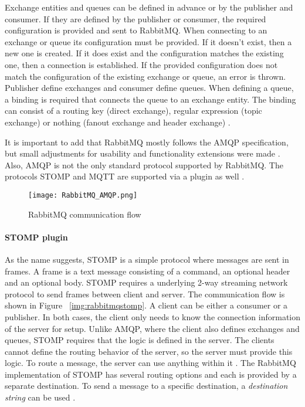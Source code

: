 Exchange entities and queues can be defined in advance or by the publisher and consumer.
If they are defined by the publisher or consumer, the required configuration is provided and sent to RabbitMQ.
When connecting to an exchange or queue its configuration must be provided.
If it doesn't exist, then a new one is created.
If it does exist and the configuration matches the existing one, then a connection is established.
If the provided configuration does not match the configuration of the existing exchange or queue, an error is thrown.
Publisher define exchanges and consumer define queues.
When defining a queue, a binding is required that connects the queue to an exchange entity.
The binding can consist of a routing key (direct exchange), regular expression (topic exchange) or nothing (fanout exchange and header exchange) \cite{RabbitMQ.2020}.

It is important to add that RabbitMQ mostly follows the \ac{AMQP} specification, but small adjustments for usability and functionality extensions were made \cite{RabbitMQ.2020b}.
Also, \ac{AMQP} is not the only standard protocol supported by RabbitMQ.
The protocols \ac{STOMP} and \ac{MQTT} are supported via a plugin as well \cite{RabbitMQ.27.05.2020}.

\begin{figure}
	\centering
	\texttt{[image: RabbitMQ\_AMQP.png]}
	\caption{RabbitMQ communication flow}
	\label{img:rabbitmqamqp}
\end{figure}

\paragraph{STOMP plugin}

As the name suggests, \acf{STOMP} is a simple protocol where messages are sent in frames.
A frame is a text message consisting of a command, an optional header and an optional body.
\ac{STOMP} requires a underlying 2-way streaming network protocol to send frames between client and server.
The communication flow is shown in Figure ~\ref{img:rabbitmqstomp}.
A client can be either a consumer or a publisher.
In both cases, the client only needs to know the connection information of the server for setup.
Unlike \ac{AMQP}, where the client also defines exchanges and queues, \ac{STOMP} requires that the logic is defined in the server.
The clients cannot define the routing behavior of the server, so the server must provide this logic.
To route a message, the server can use anything within it \cite{.25.09.2015}.
The RabbitMQ implementation of \ac{STOMP} has several routing options and each is provided by a separate destination.
To send a message to a specific destination, a \textit{destination string} can be used \cite[p. 191]{Roy.2018}.

